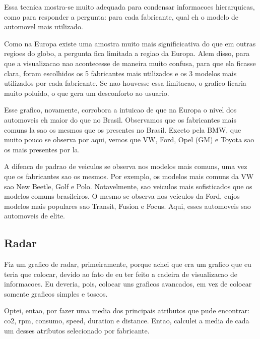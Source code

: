 \documentclass[10pt, conference]{IEEEtran}
\begin{document}
Essa tecnica mostra-se muito adequada para condensar informacoes hierarquicas, como para responder a pergunta:
para cada fabricante, qual eh o modelo de automovel mais utilizado. 

Como na Europa existe uma amostra muito mais significicativa do que em outras regioes do globo, a
pergunta fica limitada a regiao da Europa. Alem disso, para que a visualizacao nao acontecesse de maneira
muito confusa, para que ela ficasse clara, foram escolhidos os 5 fabricantes mais utilizados e os 3 modelos
mais utilizados por cada fabricante. Se nao houvesse essa limitacao, o grafico ficaria muito poluido, o que
gera um desconforto ao usuario.

Esse grafico, novamente, corrobora a intuicao de que na Europa o nivel dos automoveis eh maior do que no Brasil.
Observamos que os fabricantes mais comuns la sao os mesmos que os presentes no Brasil. Exceto pela BMW, que
muito pouco se observa por aqui, vemos que VW, Ford, Opel (GM) e Toyota sao os mais presentes por la.

A difenca de padrao de veiculos se observa nos modelos mais comuns, uma vez que os fabricantes sao os mesmos.
Por exemplo, os modelos mais comuns da VW sao New Beetle, Golf e Polo. Notavelmente, sao veiculos mais
sofisticados que os modelos comuns brasileiros. O mesmo se observa nos veiculos da Ford, cujos modelos
mais populares sao Transit, Fusion e Focus. Aqui, esses automoveis sao automoveis de elite.





\subsection{Radar}

Fiz um grafico de radar, primeiramente, porque achei que era um grafico que eu teria que colocar, devido
ao fato de eu ter feito a cadeira de visualizacao de informacoes. Eu deveria, pois, colocar uns graficos
avancados, em vez de colocar somente graficos simples e toscos. 

Optei, entao, por fazer uma media dos principais atributos que pude encontrar: co2, rpm, consumo, speed, duration 
e distance. Entao, calculei a media de cada um desses atributos selecionado por fabricante.
\end{document}
